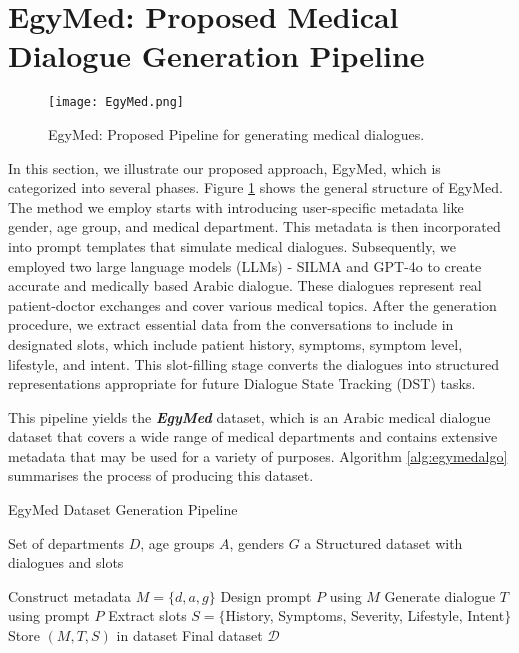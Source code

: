 \documentclass[manuscript,screen,review]{acmart}
\begin{document}
\section{EgyMed: Proposed Medical Dialogue Generation Pipeline}
\begin{figure}[htbp]
\centering
\texttt{[image: EgyMed.png]} 
\caption{\centering EgyMed: Proposed Pipeline for generating medical dialogues.}
\label{fig:EgyMed}
\end{figure}

In this section, we illustrate our proposed approach, EgyMed, which is categorized into several phases. Figure \ref{fig:EgyMed} shows the general structure of EgyMed.
The method we employ starts with introducing user-specific metadata like gender, age group, and medical department. This metadata is then incorporated into prompt templates that simulate medical dialogues.
Subsequently, we employed two large language models (LLMs) - SILMA \cite{silma_01_2024} and GPT-4o \cite{gpt4o2024system} to create accurate and medically based Arabic dialogue. These dialogues represent real patient-doctor exchanges and cover various medical topics.
After the generation procedure, we extract essential data from the conversations to include in designated slots, which include patient history, symptoms, symptom level, lifestyle, and intent. This slot-filling stage converts the dialogues into structured representations appropriate for future Dialogue State Tracking (DST) tasks.

This pipeline yields the \textbf{\textit{EgyMed}} dataset, which is an Arabic medical dialogue dataset that covers a wide range of medical departments and contains extensive metadata that may be used for a variety of purposes.  Algorithm \ref{alg:egymedalgo} summarises the process of producing this dataset.

\begin{algorithm}
\caption{EgyMed Dataset Generation Pipeline}
\label{alg:egymedalgo}
\begin{algorithmic}[1]
\Require Set of departments $D$, age groups $A$, genders $G$
\Ensure a Structured dataset with dialogues and slots

    \State Construct metadata $M = \{d, a, g\}$
    \State Design prompt $P$ using $M$
        \State Generate dialogue $T$ using prompt $P$
        \State Extract slots $S = \{$History, Symptoms, Severity, Lifestyle, Intent$\}$
        \State Store $(M, T, S)$ in dataset
    \EndFor
\EndFor
\State \Return Final dataset $\mathcal{D}$
\end{algorithmic}
\end{algorithm}
\end{document}

